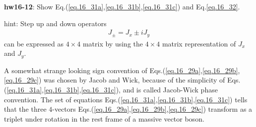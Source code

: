 \documentclass[12pt]{article}
\begin{document}
{\bf hw16-12}: Show Eq.(\ref{eq.16_31a},\ref{eq.16_31b},\ref{eq.16_31c}) and Eq.\ref{eq.16_32}.

hint: Step up and down operators
\begin{eqnarray}
  J_\pm = J_x \pm i J_y \label{eq.16_33}
\end{eqnarray}
can be expressed as $4\times 4$ matrix by using the $4\times 4$ matrix representation of $J_x$ and $J_y$.

A somewhat strange looking sign convention of Eqs.(\ref{eq.16_29a},\ref{eq.16_29b},\ref{eq.16_29c}) was chosen by
Jacob and Wick, because of the simplicity of Eqs.(\ref{eq.16_31a},\ref{eq.16_31b},\ref{eq.16_31c}), and is called
Jacob-Wick phase convention.
The set of equations Eqs.(\ref{eq.16_31a},\ref{eq.16_31b},\ref{eq.16_31c}) tells that the three $4$-vectors Eqs.(\ref{eq.16_29a},\ref{eq.16_29b},\ref{eq.16_29c}) transform as a triplet under rotation in the rest frame of a massive vector boson.
\end{document}
